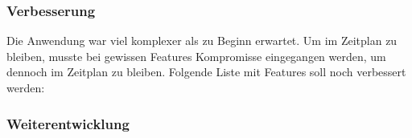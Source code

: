 \subsubsection{Verbesserung}
Die Anwendung war viel komplexer als zu Beginn erwartet. Um im Zeitplan zu bleiben, musste bei gewissen Features  Kompromisse eingegangen werden, um dennoch im Zeitplan zu bleiben. Folgende Liste mit Features soll noch verbessert werden:

\begin{itemize}
	
\end{itemize}

\subsubsection{Weiterentwicklung}

\newpage
